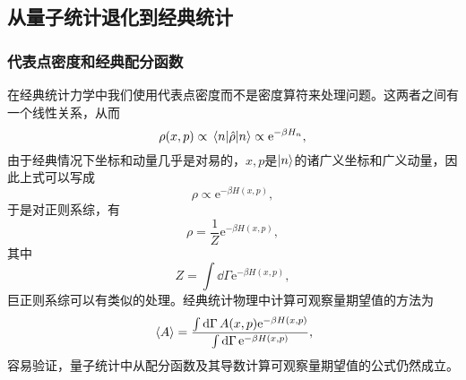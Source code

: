 \documentclass[hyperref, UTF8, a4paper]{ctexart}
\newcommand*{\ee}{\mathrm{e}}
\begin{document}
\subsection{从量子统计退化到经典统计}\label{sec:from-quantum-to-classical}

\subsubsection{代表点密度和经典配分函数}

在经典统计力学中我们使用代表点密度而不是密度算符来处理问题。这两者之间有一个线性关系，从而
\[
    \rho(x, p) \propto \mel{n}{\hat{\rho}}{n} \propto \ee^{- \beta H_n},
\]
由于经典情况下坐标和动量几乎是对易的，$x, p$是$\ket{n}$的诸广义坐标和广义动量，因此上式可以写成
\[
    \rho \propto \ee^{-\beta H(x, p)},
\]
于是对正则系综，有
\begin{equation}
    \rho = \frac{1}{Z} \ee^{- \beta H(x, p)},
\end{equation}
其中
\begin{equation}
    Z = \int \dd{\Gamma} \ee^{- \beta H(x, p)},
    \label{eq:classical-partition-function}
\end{equation}
巨正则系综可以有类似的处理。经典统计物理中计算可观察量期望值的方法为
\begin{equation}
    \expval*{A} = \frac{\int \dd{\Gamma} A(x, p) \ee^{-\beta H(x, p)}}{\int \dd{\Gamma} \ee^{-\beta H(x, p)}},
\end{equation}
容易验证，量子统计中从配分函数及其导数计算可观察量期望值的公式仍然成立。
\end{document}

